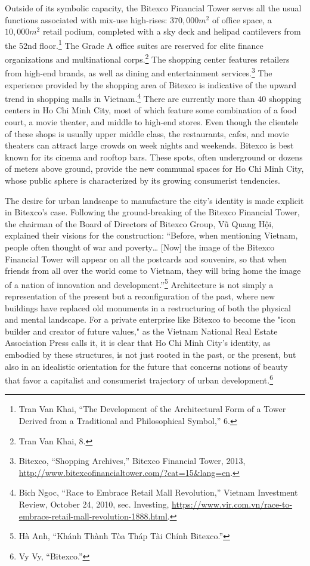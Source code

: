 Outside of its symbolic capacity, the Bitexco Financial Tower serves all the usual functions associated with mix-use high-rises: $370,000 m^2$ of office space, a $10,000 m^2$ retail podium, completed with a sky deck and helipad cantilevers from the 52nd floor.\footnote{Tran Van Khai, “The Development of the Architectural Form of a Tower Derived from a Traditional and Philosophical Symbol,” 6.} The Grade A office suites are reserved for elite finance organizations and multinational corps.\footnote{Tran Van Khai, 8.} The shopping center features retailers from high-end brands, as well as dining and entertainment services.\footnote{Bitexco, “Shopping Archives,” Bitexco Financial Tower, 2013, \url{http://www.bitexcofinancialtower.com/?cat=15&lang=en}.} The experience provided by the shopping area of Bitexco is indicative of the upward trend in shopping malls in Vietnam.\footnote{Bich Ngoc, “Race to Embrace Retail Mall Revolution,” Vietnam Investment Review, October 24, 2010, sec. Investing, \url{https://www.vir.com.vn/race-to-embrace-retail-mall-revolution-1888.html}.} There are currently more than 40 shopping centers in Ho Chi Minh City, most of which feature some combination of a food court, a movie theater, and middle to high-end stores. Even though the clientele of these shops is usually upper middle class, the restaurants, cafes, and movie theaters can attract large crowds on week nights and weekends. Bitexco is best known for its cinema and rooftop bars. These spots, often underground or dozens of meters above ground, provide the new communal spaces for Ho Chi Minh City, whose public sphere is characterized by its growing consumerist tendencies.

The desire for urban landscape to manufacture the city's identity is made explicit in Bitexco’s case. Following the ground-breaking of the Bitexco Financial Tower, the chairman of the Board of Directors of Bitexco Group, Vũ Quang Hội, explained their visions for the construction: “Before, when mentioning Vietnam, people often thought of war and poverty… [Now] the image of the Bitexco Financial Tower will appear on all the postcards and souvenirs, so that when friends from all over the world come to Vietnam, they will bring home the image of a nation of innovation and development.”\footnote{Hà Anh, “Khánh Thành Tòa Tháp Tài Chính Bitexco.”} Architecture is not simply a representation of the present but a reconfiguration of the past, where new buildings have replaced old monuments in a restructuring of both the physical and mental landscape. For a private enterprise like Bitexco to become the "icon builder and creator of future values," as the Vietnam National Real Estate Association Press calls it, it is clear that Ho Chi Minh City's identity, as embodied by these structures, is not just rooted in the past, or the present, but also in an idealistic orientation for the future that concerns notions of beauty that favor a capitalist and consumerist trajectory of urban development.\footnote{Vy Vy, “Bitexco.”}

